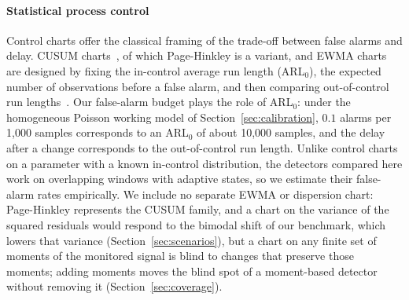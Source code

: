 \documentclass[preprint,12pt]{elsarticle}
\begin{document}
\paragraph{Statistical process control} Control charts offer the classical framing of the trade-off between false alarms and delay. CUSUM charts~\cite{page1954}, of which Page-Hinkley is a variant, and EWMA charts~\cite{roberts1959control} are designed by fixing the in-control average run length (ARL$_0$), the expected number of observations before a false alarm, and then comparing out-of-control run lengths~\cite{montgomery2019introduction}. Our false-alarm budget plays the role of ARL$_0$: under the homogeneous Poisson working model of Section~\ref{sec:calibration}, $0.1$ alarms per 1,000 samples corresponds to an ARL$_0$ of about 10,000 samples, and the delay after a change corresponds to the out-of-control run length. Unlike control charts on a parameter with a known in-control distribution, the detectors compared here work on overlapping windows with adaptive states, so we estimate their false-alarm rates empirically. We include no separate EWMA or dispersion chart: Page-Hinkley represents the CUSUM family, and a chart on the variance of the squared residuals would respond to the bimodal shift of our benchmark, which lowers that variance (Section~\ref{sec:scenarios}), but a chart on any finite set of moments of the monitored signal is blind to changes that preserve those moments; adding moments moves the blind spot of a moment-based detector without removing it (Section~\ref{sec:coverage}).
\end{document}
